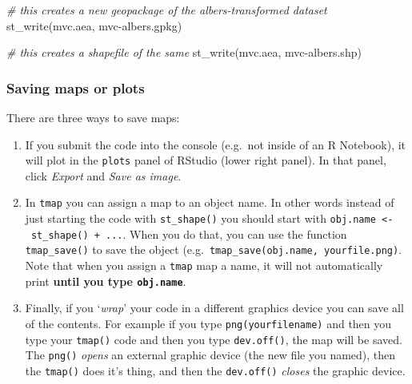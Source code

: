 \documentclass[
]{book}
\newenvironment{Shaded}{\begin{snugshade}}{\end{snugshade}}
\newcommand{\CommentTok}[1]{\textcolor[rgb]{0.56,0.35,0.01}{\textit{#1}}}
\newcommand{\FunctionTok}[1]{\textcolor[rgb]{0.00,0.00,0.00}{#1}}
\newcommand{\NormalTok}[1]{#1}
\newcommand{\StringTok}[1]{\textcolor[rgb]{0.31,0.60,0.02}{#1}}
\providecommand{\tightlist}{%
  \setlength{\itemsep}{0pt}\setlength{\parskip}{0pt}}
\begin{document}
\begin{Shaded}
\begin{Highlighting}[]
\CommentTok{\# this creates a new geopackage of the albers{-}transformed dataset}
\FunctionTok{st\_write}\NormalTok{(mvc.aea, }\StringTok{\textquotesingle{}mvc{-}albers.gpkg\textquotesingle{}}\NormalTok{)}

\CommentTok{\# this creates a shapefile of the same}
\FunctionTok{st\_write}\NormalTok{(mvc.aea, }\StringTok{\textquotesingle{}mvc{-}albers.shp\textquotesingle{}}\NormalTok{)}
\end{Highlighting}
\end{Shaded}

\hypertarget{saving-maps-or-plots}{%
\subsubsection{Saving maps or plots}\label{saving-maps-or-plots}}

There are three ways to save maps:

\begin{enumerate}
\def\labelenumi{\arabic{enumi}.}
\tightlist
\item
  If you submit the code into the console (e.g.~not inside of an R Notebook), it will plot in the \texttt{plots} panel of RStudio (lower right panel). In that panel, click \emph{Export} and \emph{Save as image}.
\item
  In \texttt{tmap} you can assign a map to an object name. In other words instead of just starting the code with \texttt{st\_shape()} you should start with \texttt{obj.name\ \textless{}-\ st\_shape()\ +\ ...}. When you do that, you can use the function \texttt{tmap\_save()} to save the object (e.g.~\texttt{tmap\_save(obj.name,\ \textquotesingle{}yourfile.png\textquotesingle{})}. Note that when you assign a \texttt{tmap} map a name, it will not automatically print \textbf{until you type \texttt{obj.name}}.\\
\item
  Finally, if you `\emph{wrap}' your code in a different graphics device you can save all of the contents. For example if you type \texttt{png(yourfilename)} and then you type your \texttt{tmap()} code and then you type \texttt{dev.off()}, the map will be saved. The \texttt{png()} \emph{opens} an external graphic device (the new file you named), then the \texttt{tmap()} does it's thing, and then the \texttt{dev.off()} \emph{closes} the graphic device.
\end{enumerate}
\end{document}
